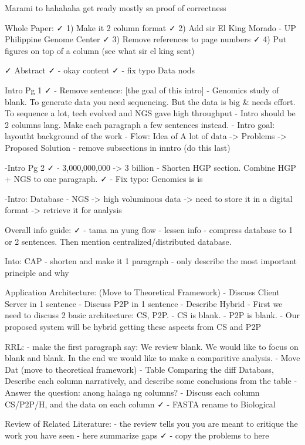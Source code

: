 Marami to hahahaha get ready mostly sa proof of correctness

Whole Paper:
✓ 1) Make it 2 column format
✓ 2) Add sir El King Morado - UP Philippine Genome Center
✓ 3) Remove references to page numbers
✓ 4) Put figures on top of a column (see what sir el king sent)

✓ Abstract
✓ - okay content
✓ - fix typo Data nods

Intro Pg 1
✓ - Remove sentence: [the goal of this intro]
- Genomics study of blank. To generate data you need sequencing. But the data is big & needs effort. To sequence a lot, tech evolved and NGS gave high throughput
- Intro should be 2 columns lang. Make each paragraph a few sentences instead.
- Intro goal: layoutht background of the work
- Flow: Idea of A lot of data -> Problems -> Proposed Solution
- remove subsections in inntro (do this last)


-Intro Pg 2
✓ - 3,000,000,000 -> 3 billion
- Shorten HGP section. Combine HGP + NGS to one paragraph.
✓ - Fix typo: Genomics is is

-Intro: Database
- NGS -> high voluminous data -> need to store it in a digital format -> retrieve it for analysis


Overall info guide: 
✓ - tama na yung flow
- lessen info
- compress database to 1 or 2 sentences. Then mention centralized/distributed database.

Into: CAP
- shorten and make it 1 paragraph
- only describe the most important principle and why

Application Architecture: (Move to Theoretical Framework)
- Discuss Client Server in 1 sentence
- Discuss P2P in 1 sentence
- Describe Hybrid 
- First we need to discuss 2 basic architecture: CS, P2P. 
- CS is blank. 
- P2P is blank. 
- Our proposed system will be hybrid getting these aspects from CS and P2P

RRL:
- make the first paragraph say: We review blank. We would like to focus on blank and blank. In the end we would like to make a comparitive analysis. 
- Move Dat (move to theoretical framework)
- Table Comparing the diff Databass, Describe each column narratively, and describe some conclusions from the table
- Answer the question: anong halaga ng columns? 
- Discuss each column CS/P2P/H, and the data on each column
✓ - FASTA rename to Biological

Review of Related Literature:
- the review tells you you are meant to critique the work you have seen
- here summarize gaps 
✓ - copy the problems to here



